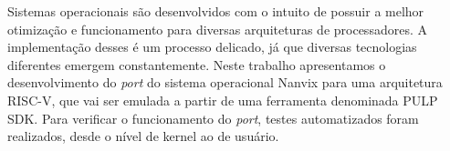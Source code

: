 \begin{resumo}
    Sistemas operacionais são desenvolvidos com o intuito de possuir a melhor otimização e funcionamento para diversas arquiteturas de 
    processadores. A implementação desses é um processo delicado, já que diversas tecnologias diferentes emergem constantemente. Neste 
    trabalho apresentamos o desenvolvimento do \textit{port} do sistema operacional Nanvix para uma arquitetura RISC-V, que vai ser emulada a 
    partir de uma ferramenta denominada PULP SDK. Para verificar o funcionamento do \textit{port}, testes automatizados foram realizados, desde o
    nível de kernel ao de usuário. 
\end{resumo}
